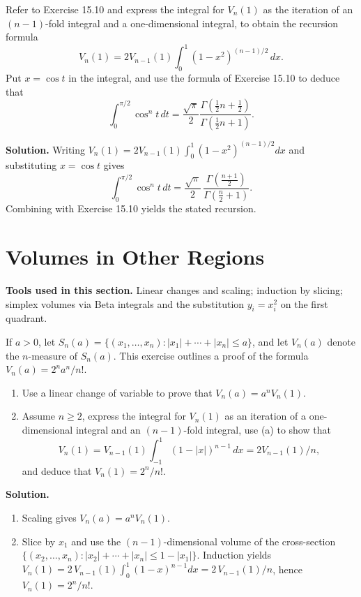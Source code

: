 \begin{problembox}
Refer to Exercise 15.10 and express the integral for \( V_n(1) \) as the iteration of an \( (n - 1) \)-fold integral and a one-dimensional integral, to obtain the recursion formula
\[
V_n(1) = 2V_{n-1}(1) \int_0^1 (1 - x^2)^{(n-1)/2} \, dx.
\]
Put \( x = \cos t \) in the integral, and use the formula of Exercise 15.10 to deduce that
\[
\int_0^{\pi/2} \cos^n t \, dt = \frac{\sqrt{\pi}}{2} \frac{\Gamma(\frac{1}{2}n + \frac{1}{2})}{\Gamma(\frac{1}{2}n + 1)}.
\]
\end{problembox}

\noindent\textbf{Solution.}
Writing \(V_n(1)=2V_{n-1}(1)\int_0^1 (1-x^2)^{(n-1)/2}dx\) and substituting \(x=\cos t\) gives
\[
\int_0^{\pi/2} \cos^n t\,dt = \frac{\sqrt{\pi}}{2}\,\frac{\Gamma(\tfrac{n+1}{2})}{\Gamma(\tfrac{n}{2}+1)}.
\]
Combining with Exercise 15.10 yields the stated recursion.

\section{Volumes in Other Regions}

\noindent\textbf{Tools used in this section.} Linear changes and scaling; induction by slicing; simplex volumes via Beta integrals and the substitution \(y_i=x_i^2\) on the first quadrant.

\begin{problembox}
If \( a > 0 \), let \( S_n(a) = \{(x_1, \ldots, x_n): |x_1| + \cdots + |x_n| \leq a\} \), and let \( V_n(a) \) denote the \( n \)-measure of \( S_n(a) \). This exercise outlines a proof of the formula \( V_n(a) = 2^n a^n / n! \).
\begin{enumerate}[label=(\alph*)]
\item Use a linear change of variable to prove that \( V_n(a) = a^n V_n(1) \).
\item Assume \( n \geq 2 \), express the integral for \( V_n(1) \) as an iteration of a one-dimensional integral and an \( (n - 1) \)-fold integral, use (a) to show that
\[
V_n(1) = V_{n-1}(1) \int_{-1}^1 (1 - |x|)^{n-1} \, dx = 2V_{n-1}(1)/n,
\]
and deduce that \( V_n(1) = 2^n / n! \).
\end{enumerate}
\end{problembox}

\noindent\textbf{Solution.}
\begin{enumerate}[label=(\alph*)]
\item Scaling gives \(V_n(a)=a^n V_n(1)\).
\item Slice by \(x_1\) and use the \((n-1)\)-dimensional volume of the cross-section \(\{(x_2,\ldots,x_n): |x_2|+\cdots+|x_n|\le 1-|x_1|\}\). Induction yields
\(V_n(1)=2\,V_{n-1}(1)\int_0^1 (1-x)^{n-1}dx=2\,V_{n-1}(1)/n\), hence \(V_n(1)=2^n/n!\).
\end{enumerate}

